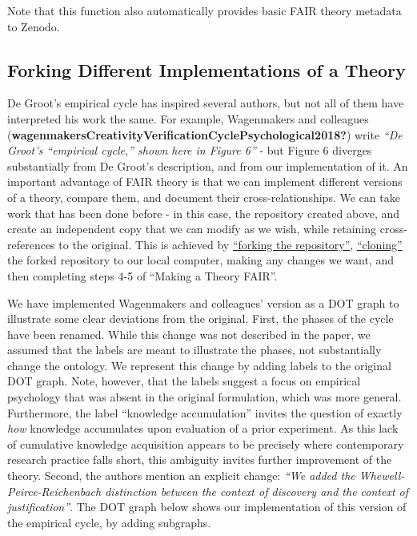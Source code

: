\documentclass[
  man,floatsintext]{apa6}
\begin{document}
Note that this function also automatically provides basic FAIR theory metadata to Zenodo.

\subsection{Forking Different Implementations of a Theory}\label{forking-different-implementations-of-a-theory}

De Groot's empirical cycle has inspired several authors,
but not all of them have interpreted his work the same.
For example, Wagenmakers and colleagues (\textbf{wagenmakersCreativityVerificationCyclePsychological2018?}) write \emph{``De Groot's ``empirical cycle,'' shown here in Figure 6''} - but Figure 6 diverges substantially from De Groot's description, and from our implementation of it.
An important advantage of FAIR theory is that we can implement different versions of a theory, compare them, and document their cross-relationships.
We can take work that has been done before - in this case, the repository created above, and create an independent copy that we can modify as we wish, while retaining cross-references to the original.
This is achieved by \href{https://docs.github.com/en/pull-requests/collaborating-with-pull-requests/working-with-forks/fork-a-repo}{``forking the repository''},
\href{https://docs.github.com/en/pull-requests/collaborating-with-pull-requests/working-with-forks/fork-a-repo}{``cloning''} the forked repository to our local computer,
making any changes we want, and then completing steps 4-5 of ``Making a Theory FAIR''.

We have implemented Wagenmakers and colleagues' version as a DOT graph
to illustrate some clear deviations from the original.
First, the phases of the cycle have been renamed.
While this change was not described in the paper,
we assumed that the labels are meant to illustrate the phases, not substantially change the ontology.
We represent this change by adding labels to the original DOT graph.
Note, however, that the labels suggest a focus on empirical psychology that was absent in the original formulation, which was more general.
Furthermore, the label ``knowledge accumulation'' invites the question of exactly \emph{how} knowledge accumulates upon evaluation of a prior experiment.
As this lack of cumulative knowledge acquisition appears to be precisely where contemporary research practice falls short, this ambiguity invites further improvement of the theory.
Second, the authors mention an explicit change: \emph{``We added the Whewell-Peirce-Reichenbach distinction between the context of discovery and the context of justification''}.
The DOT graph below shows our implementation of this version of the empirical cycle, by adding subgraphs.
\end{document}
